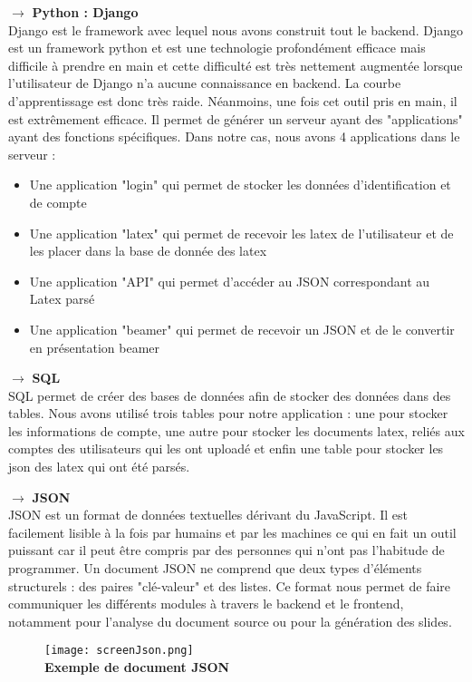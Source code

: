 \documentclass[12pt]{article}
\begin{document}
\noindent
$\longrightarrow$ \textbf{Python : Django}\\
Django est le framework avec lequel nous avons construit tout le backend. Django est un framework python et est une technologie profondément efficace mais difficile à prendre en main et cette difficulté est très nettement augmentée lorsque l'utilisateur de Django n'a aucune connaissance en backend. La courbe d'apprentissage est donc très raide. Néanmoins, une fois cet outil pris en main, il est extrêmement efficace. Il permet de générer un serveur ayant des "applications" ayant des fonctions spécifiques. Dans notre cas, nous avons 4 applications dans le serveur :

\begin{itemize}
    \item Une application "login" qui permet de stocker les données d'identification et de compte
    \item Une application "latex" qui permet de recevoir les latex de l'utilisateur et de les placer dans la base de donnée des latex
    \item Une application "API" qui permet d'accéder au JSON correspondant au Latex parsé
    \item Une application "beamer" qui permet de recevoir un JSON et de le convertir en présentation beamer
\end{itemize}

\noindent
$\longrightarrow$ \textbf{SQL}\\
SQL permet de créer des bases de données afin de stocker des données dans des tables. Nous avons utilisé trois tables pour notre application : une pour stocker les informations de compte, une autre pour stocker les documents latex, reliés aux comptes des utilisateurs qui les ont uploadé et enfin une table pour stocker les json des latex qui ont été parsés. 

\noindent
$\longrightarrow$ \textbf{JSON}\\
JSON est un format de données textuelles dérivant du JavaScript. Il est facilement lisible à la fois par humains et par les machines ce qui en fait un outil puissant car il peut être compris par des personnes qui n'ont pas l'habitude de programmer. Un document JSON ne comprend que deux types d'éléments structurels : des paires "clé-valeur" et des listes. Ce format nous permet de faire communiquer les différents modules à travers le backend et le frontend, notamment pour l'analyse du document source ou pour la génération des slides.


\begin{figure}[h!]
    \centering
    \texttt{[image: screenJson.png]} \\
    \textbf{Exemple de document JSON}
\end{figure}
\end{document}
